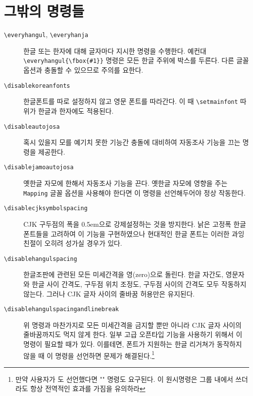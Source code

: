 \documentclass[a4paper]{article}
\def\logoko{\textsf{k}\kern-.2ex\textit{o}}
\def\XeTeX{\hologo{XeTeX}}
\def\xetexko{\XeTeX\kern-.1ex -\logoko}
\def\cs#1{\texttt{\textbackslash #1}}
\begin{document}
\section{그밖의 명령들}\label{sec:etccmds}
\begin{description}
  \item[\cs{everyhangul}, \cs{everyhanja}]
    한글 또는 한자에 대해 글자마다 지시한 명령을 수행한다. 예컨대
    \verb|\everyhangul{\fbox{#1}}| 명령은 모든
    {\fboxsep=1pt 한글 주위에 박스}를
    두른다.  다른 글꼴 옵션과 충돌할 수 있으므로
    주의를 요한다.

  \item[\cs{disablekoreanfonts}]
한글폰트를 따로 설정하지 않고 영문 폰트를 따라간다.
이 때  \verb|\setmainfont| 따위가 한글과 한자에도 적용된다.

  \item[\cs{disableautojosa}]
혹시 있을지 모를 예기치 못한 기능간 충돌에 대비하여 자동조사 기능을
끄는 명령을 제공한다.

  \item[\cs{disablejamoautojosa}]
옛한글 자모에 한해서 자동조사 기능을 끈다.
옛한글 자모에 영향을 주는 \verb+Mapping+ 글꼴 옵션을 사용해야 한다면
이 명령을 선언해두어야 정상 작동한다.

  \item[\cs{disablecjksymbolspacing}]
CJK 구두점의 폭을 0.5em으로 강제설정하는 것을 방지한다.
 낡은 고정폭 한글 폰트들을 고려하여 이 기능을 구현하였으나
현대적인 한글 폰트는 이러한 과잉친절이 오히려 성가실 경우가 있다.

  \item[\cs{disablehangulspacing}]
한글조판에 관련된 모든 미세간격을 영(zero)으로 돌린다. 한글 자간도,
영문자와 한글 사이 간격도, 구두점 위치 조정도, 구두점 사이의 간격도
모두 작동하지 않는다. 그러나 CJK 글자 사이의 줄바꿈 허용만은 유지된다.

  \item[\cs{disablehangulspacingandlinebreak}]
위 명령과 마찬가지로 모든 미세간격을 금지할 뿐만 아니라 CJK 글자 사이의
줄바꿈까지도 먹지 않게 한다.
일부 고급 오픈타입 기능을 사용하기 위해서 이 명령이 필요할 때가 있다.
이를테면, 폰트가 지원하는 한글 리거쳐가 동작하지 않을 때 이 명령을
선언하면 문제가 해결된다.\footnote{만약 사용자가
  {\ttfamily\string\XeTeXlinebreaklocale}도 선언했다면
  {\ttfamily\string\XeTeXlinebreaklocale""} 명령도 요구된다.
  이 원시명령은 그룹 내에서 쓰더라도 항상 전역적인 효과를 가짐을 유의하라}
\end{description}
\end{document}
